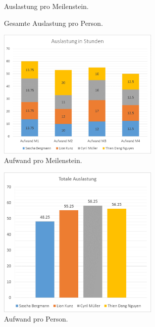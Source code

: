 
\begin{figure}[H]
\centering

\caption{Auslastung pro Meilenstein.}
\end{figure}



\begin{figure}[H]
\centering

\caption{Gesamte Auslastung pro Person.}
\end{figure}

\begin{figure}[H]
\centering
\includegraphics[width=0.7\textwidth]{graphics/auslastung_meilensteine.png}
\caption{Aufwand pro Meilenstein.}
\end{figure}


\begin{figure}[H]
\centering
\includegraphics[width=0.7\textwidth]{graphics/auslastung_total.png}
\caption{Aufwand pro Person.}
\end{figure}
